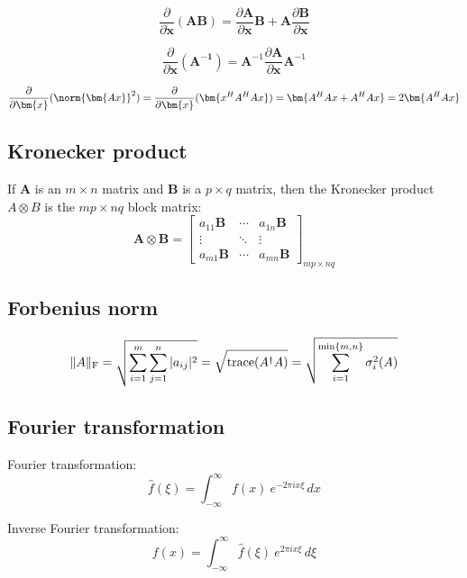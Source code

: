 \documentclass[12pt]{article}
\numberwithin{equation}{section}
\begin{document}
\begin{equation} \label{eq:matrixderivativ2}
	\frac{\partial}{\partial \bm{x}}(\bm{AB}) = 
	\frac{\partial \bm{A}}{\partial \bm{x}} \bm{B} + \bm{A} \frac{\partial \bm{B}}{\partial \bm{x}} 
\end{equation}

\begin{equation}\label{eq:matrixderivativ3}
	\frac{\partial}{\partial \bm{x}}(\bm{A^{-1}}) = 
	\bm{A}^{-1} \frac{\partial \bm{A}}{\partial \bm{x}} \bm{A}^{-1}
\end{equation}

\begin{equation}\label{eq:matrixderivativ4}
	\frac{\partial}{\partial \bm{x}}(\norm{\bm{Ax}}^2) 
	= \frac{\partial}{\partial \bm{x}} (\bm{x^HA^HAx} )
	= \bm{A^HAx + A^HAx} = 2\bm{A^HAx}
\end{equation}
\subsection{Kronecker product} \label{ch:kronecker}
If \textbf{A} is an $m \times n$ matrix and \textbf{B} is a $p \times q$ matrix, then the Kronecker product $A \otimes B$ is the $mp  \times nq$ block matrix:
\begin{equation}
	\mathbf{A}\otimes\mathbf{B} = 
	\begin{bmatrix} 
		a_{11} \mathbf{B} & \cdots & a_{1n}\mathbf{B} \\ 
		\vdots & \ddots & \vdots 
		\\ a_{m1} \mathbf{B} & \cdots & a_{mn} \mathbf{B} 
	\end{bmatrix}_{mp\times nq}
\end{equation} \par
\subsection{Forbenius norm} \label{ch:forbenius}
\begin{equation}
	\|A\|_{\rm F} = \sqrt{\sum_{i=1}^m \sum_{j=1}^n |a_{ij}|^2} = \sqrt{\operatorname{trace}(A^\dagger A)} = \sqrt{\sum_{i=1}^{\min\{m, n\}} \sigma_i^2(A)}
\end{equation}
\subsection{Fourier transformation}
Fourier transformation:
\begin{equation}\label{eq:fourierTrans}
	\hat{f}(\xi) = \int_{-\infty}^{\infty} f(x)\ e^{-2\pi i x \xi}\,dx
\end{equation} \par
Inverse Fourier transformation: 
\begin{equation}
	f(x) = \int_{-\infty}^{\infty} \hat f(\xi)\ e^{2 \pi i x \xi}\,d\xi
\end{equation} \par
\end{document}

